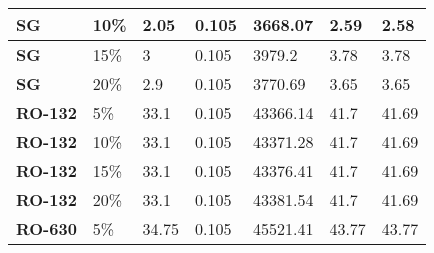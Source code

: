 \begin{table}[h!]
\begin{tabular}{|l|l|l|l|l|l|l|}
\textbf{SG}                & 10\%                                                                                         & 2.05                                            & 0.105                                     & 3668.07                & 2.59               & 2.58                                 \\ \hline
\textbf{SG}                & 15\%                                                                                         & 3                                               & 0.105                                     & 3979.2                 & 3.78               & 3.78                                 \\ \hline
\textbf{SG}                & 20\%                                                                                         & 2.9                                             & 0.105                                     & 3770.69                & 3.65               & 3.65                                 \\ \hline
\textbf{RO-132}            & 5\%                                                                                          & 33.1                                            & 0.105                                     & 43366.14               & 41.7               & 41.69                                \\ \hline
\textbf{RO-132}            & 10\%                                                                                         & 33.1                                            & 0.105                                     & 43371.28               & 41.7               & 41.69                                \\ \hline
\textbf{RO-132}            & 15\%                                                                                         & 33.1                                            & 0.105                                     & 43376.41               & 41.7               & 41.69                                \\ \hline
\textbf{RO-132}            & 20\%                                                                                         & 33.1                                            & 0.105                                     & 43381.54               & 41.7               & 41.69                                \\ \hline
\textbf{RO-630}            & 5\%                                                                                          & 34.75                                           & 0.105                                     & 45521.41               & 43.77              & 43.77                                \\ \hline

\end{tabular}
\end{table}
